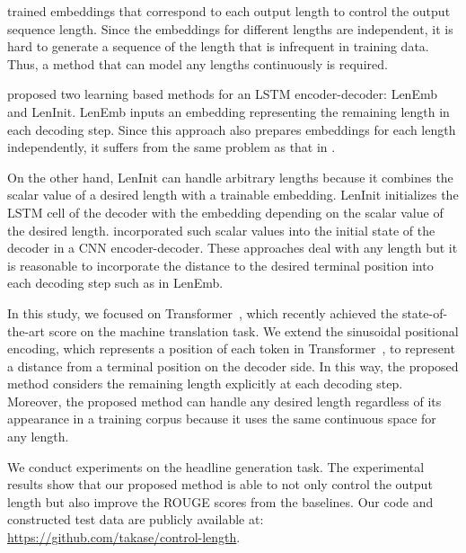 \documentclass[11pt,a4paper]{article}
\begin{document}
 trained embeddings that correspond to each output length to control the output sequence length.
Since the embeddings for different lengths are independent, it is hard to generate a sequence of the length that is infrequent in training data.
Thus, a method that can model any lengths continuously is required.


 proposed two learning based methods for an LSTM encoder-decoder: LenEmb and LenInit.
LenEmb inputs an embedding representing the remaining length in each decoding step.
Since this approach also prepares embeddings for each length independently, it suffers from the same problem as that in .


On the other hand, LenInit can handle arbitrary lengths because it combines the scalar value of a desired length with a trainable embedding.
LenInit initializes the LSTM cell of the decoder with the embedding depending on the scalar value of the desired length.
 incorporated such scalar values into the initial state of the decoder in a CNN encoder-decoder.
These approaches deal with any length but it is reasonable to incorporate the distance to the desired terminal position into each decoding step such as in LenEmb.



In this study, we focused on Transformer~\cite{NIPS2017_7181}, which recently achieved the state-of-the-art score on the machine translation task.
We extend the sinusoidal positional encoding, which represents a position of each token in Transformer~\cite{NIPS2017_7181}, to represent a distance from a terminal position on the decoder side.
In this way, the proposed method considers the remaining length explicitly at each decoding step.
Moreover, the proposed method can handle any desired length regardless of its appearance in a training corpus because it uses the same continuous space for any length.


We conduct experiments on the headline generation task.
The experimental results show that our proposed method is able to not only control the output length but also improve the ROUGE scores from the baselines.
Our code and constructed test data are publicly available at: \href{https://github.com/takase/control-length}{https://github.com/takase/control-length}.
\end{document}
